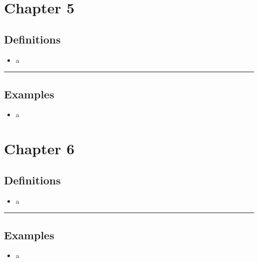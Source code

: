 \documentclass[12pt]{article}
\begin{document}

\newpage
\section{Chapter 5}

\subsection{Definitions}
\begin{itemize}
    \item a
\end{itemize}
\noindent\rule{\linewidth}{1pt}

\subsection{Examples}
\begin{itemize}
    \item a
\end{itemize}


\newpage
\section{Chapter 6}

\subsection{Definitions}
\begin{itemize}
    \item a
\end{itemize}
\noindent\rule{\linewidth}{1pt}

\subsection{Examples}
\begin{itemize}
    \item a
\end{itemize}
\end{document}
